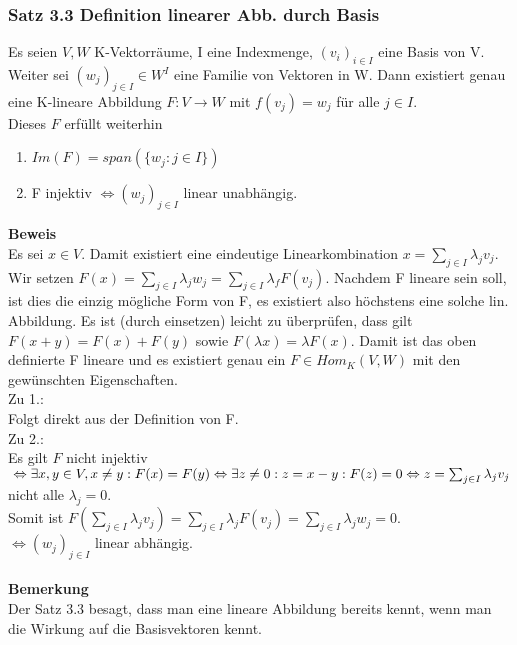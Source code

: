 \documentclass{scrartcl}
\newcommand{\lb}{\lambda}
\begin{document}
\subsubsection{Satz 3.3 Definition linearer Abb. durch Basis}
Es seien \(V, W\) K-Vektorr\"aume, I eine Indexmenge, \((v_i)_{i \in I}\) eine Basis von V. Weiter sei \((w_j)_{j \in I} \in W^I\) eine Familie von Vektoren in W. Dann existiert genau eine K-lineare Abbildung \(F : V \to W\) mit \(f(v_j) = w_j\) f\"ur alle \(j \in I\).\\
Dieses \(F\) erf\"ullt weiterhin
\begin{enumerate}
\item{\(Im(F) = span(\{w_j : j \in I\})\)}
\item{F injektiv \(\Leftrightarrow (w_j)_{j \in I}\) linear unabh\"angig.}
\end{enumerate}
\textbf{Beweis}\\
Es sei \(x \in V\). Damit existiert eine eindeutige Linearkombination \(x = \sum_{j \in I} \lb_j v_j\). Wir setzen \(F(x) = \sum_{j \in I}\lb_jw_j = \sum_{j \in I} \lb_fF(v_j)\). Nachdem F lineare sein soll, ist dies die einzig m\"ogliche Form von F, es existiert also h\"ochstens eine solche lin. Abbildung. Es ist (durch einsetzen) leicht zu \"uberpr\"ufen, dass gilt \(F(x + y) = F(x) + F(y)\) sowie \(F(\lb x) = \lb F(x)\). Damit ist das oben definierte F lineare und es existiert genau ein \(F \in Hom_K(V, W)\) mit den gew\"unschten Eigenschaften.\\
Zu 1.:\\
Folgt direkt aus der Definition von F.\\
Zu 2.:\\
Es gilt \(F\) nicht injektiv \(\\
\Leftrightarrow \exists x, y \in V, x \neq y : F(x) = F(y)\\
\Leftrightarrow \exists z \neq 0 : z = x - y : F(z) = 0\\
\Leftrightarrow z = \sum_{j \in I} \lb_j v_j\) nicht alle \(\lb_j = 0\).\\
Somit ist \(F(\sum_{j \in I}\lb_j v_j) = \sum_{j \in I} \lb_j F(v_j) = \sum_{j \in I} \lb_j w_j = 0\).\\
\(\Leftrightarrow (w_j)_{j \in I}\) linear abh\"angig.\\
\\
\textbf{Bemerkung}\\
Der Satz 3.3 besagt, dass man eine lineare Abbildung bereits kennt, wenn man die Wirkung auf die Basisvektoren kennt.
\end{document}
